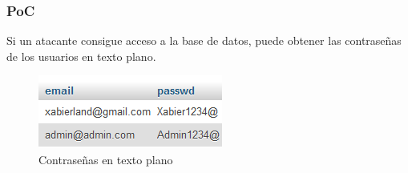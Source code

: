 \documentclass{report}
\begin{document}
                \subsubsection{PoC}
                    Si un atacante consigue acceso a la base de datos, puede obtener las contraseñas de los usuarios en texto plano.
                    \begin{figure}[H]
                        \centering
                        \includegraphics[width=\textwidth]{./img/vulnerabilidades/3.2.3.1.png}
                        \caption{Contraseñas en texto plano}
                    \end{figure}
\end{document}
